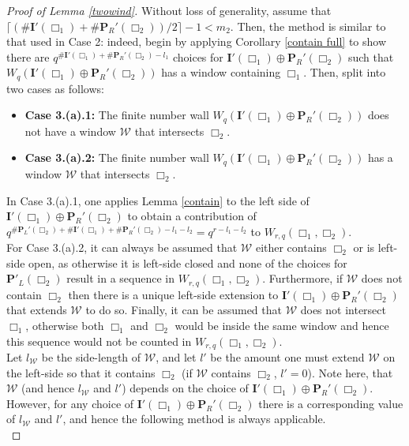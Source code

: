 \documentclass{article}
\theoremstyle{definition}
\numberwithin{equation}{subsection}
\begin{document}
\begin{proof}[Proof of Lemma \ref{twowind}]
\noindent  Without loss of generality, assume that $\lceil(\#\mathbf{I}'(\Box_1)+\#\mathbf{P}_R'(\Box_2))/2\rceil-1<m_2$. Then, the method is similar to that used in Case 2: indeed, begin by applying Corollary \ref{contain full} to show there are $q^{\#\textbf{I}'(\Box_1)+\#\mathbf{P}_R'(\Box_2)-l_1}$ choices for $\textbf{I}'(\Box_1)\oplus\mathbf{P}_R'(\Box_2)$ such that $W_q(\textbf{I}'(\Box_1)\oplus\mathbf{P}_R'(\Box_2))$ has a window containing $\Box_1$. Then, split into two cases as follows: \begin{itemize}
    \item[] \textbf{Case 3.(a).1:} The finite number wall $W_q(\textbf{I}'(\Box_1)\oplus\mathbf{P}_R'(\Box_2))$ does not have a window $\mathcal{W}$ that intersects $\Box_2$.
    \item[]\textbf{Case 3.(a).2:} The finite number wall $W_q(\textbf{I}'(\Box_1)\oplus\mathbf{P}_R'(\Box_2))$ has a window $\mathcal{W}$ that intersects $\Box_2$.
\end{itemize}
\noindent In Case 3.(a).1, one applies Lemma \ref{contain} to the left side of $\textbf{I}'(\Box_1)\oplus\mathbf{P}_R'(\Box_2)$ to obtain a contribution of $q^{\#\textbf{P}_L'(\Box_2)+\#\textbf{I}'(\Box_1)+\#\mathbf{P}_R'(\Box_2)-l_1-l_2}=q^{r-l_1-l_2}$ to $W_{r,q}(\Box_1,\Box_2)$.\\

\noindent For Case 3.(a).2, it can always be assumed that $\mathcal{W}$ either contains $\Box_2$ or is left-side open, as otherwise it is left-side closed and none of the choices for $\textbf{P}'_L(\Box_2)$ result in a sequence in $W_{r,q}(\Box_1,\Box_2)$. Furthermore, if $\mathcal{W}$ does not contain $\Box_2$ then there is a unique left-side extension to $\textbf{I}'(\Box_1)\oplus\mathbf{P}_R'(\Box_2)$ that extends $\mathcal{W}$ to do so. Finally, it can be assumed that $\mathcal{W}$ does not intersect $\Box_1$, otherwise both $\Box_1$ and $\Box_2$ would be inside the same window and hence this sequence would not be counted in $W_{r,q}(\Box_1,\Box_2)$.\\

\noindent Let $l_\mathcal{W}$ be the side-length of $\mathcal{W}$, and let $l'$ be the amount one must extend $\mathcal{W}$ on the left-side so that it contains $\Box_2$ (if $\mathcal{W}$ contains $\Box_2$, $l'=0$). Note here, that $\mathcal{W}$ (and hence $l_\mathcal{W}$ and $l'$) depends on the choice of $\textbf{I}'(\Box_1)\oplus\mathbf{P}_R'(\Box_2)$. However, for any choice of $\textbf{I}'(\Box_1)\oplus\mathbf{P}_R'(\Box_2)$ there is a corresponding value of $l_\mathcal{W}$ and $l'$, and hence the following method is always applicable. \\


\end{proof}
\end{document}
